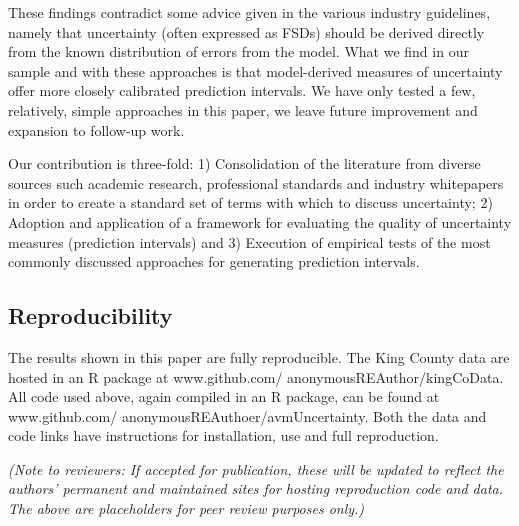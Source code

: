 \documentclass[colTwo]{anon}
\theoremstyle{definition}
\begin{document}
These findings contradict some advice given in the various industry guidelines, namely that uncertainty (often expressed as FSDs) should be derived directly from the known distribution of errors from the model.  What we find in our sample and with these approaches is that model-derived measures of uncertainty offer more closely calibrated prediction intervals.  We have only tested a few, relatively, simple approaches in this paper, we leave future improvement and expansion to follow-up work. 

Our contribution is three-fold: 1) Consolidation of the literature from diverse sources such academic research, professional standards and industry whitepapers in order to create a standard set of terms with which to discuss uncertainty; 2) Adoption and application of a framework for evaluating the quality of uncertainty measures (prediction intervals) and 3) Execution of empirical tests of the most commonly discussed approaches for generating prediction intervals.  

\subsection{Reproducibility}

The results shown in this paper are fully reproducible.  The King County data are hosted in an R package at www.github.com/ anonymousREAuthor/kingCoData.  All code used above, again compiled in an R package, can be found at www.github.com/ anonymousREAuthoer/avmUncertainty.  Both the data and code links have instructions for installation, use and full reproduction.   

\textit{(Note to reviewers: If accepted for publication, these will be updated to reflect the authors’ permanent and maintained sites for hosting reproduction code and data. The above are placeholders for peer review purposes only.)}

\end{document}
